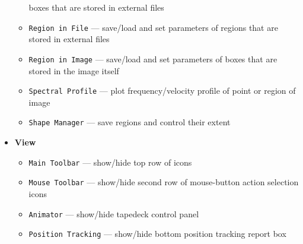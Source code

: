 \begin{itemize}
\begin{itemize}
       boxes that are stored in external files
     \item {\tt Region in File} ---  save/load and set parameters of
       regions that are stored in external files
     \item {\tt Region in Image} ---  save/load and set parameters of
       boxes that are stored in the image itself
      \item {\tt Spectral Profile} --- plot frequency/velocity profile
                 of point or region of image
      \item {\tt Shape Manager} --- save regions and control their extent 
  \end{itemize}
\item {\bf View}
  \begin{itemize}
      \item {\tt Main Toolbar} --- show/hide top row of icons
      \item {\tt Mouse Toolbar} --- show/hide second row of
                 mouse-button action selection icons
      \item {\tt Animator} --- show/hide tapedeck control panel
      \item {\tt Position Tracking} --- show/hide bottom position
                 tracking report box  
  \end{itemize}
\end{itemize}

